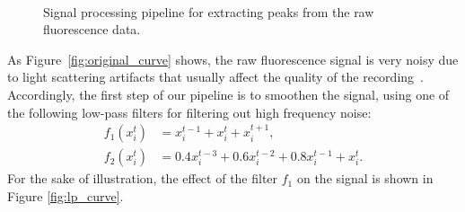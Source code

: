 \documentclass[wcp]{jmlr}
\begin{document}
\begin{figure}
\centering
{}
\\
\caption{Signal processing pipeline for extracting peaks from the raw fluorescence data.}
\label{fig:filtered-signal}
\end{figure}

As Figure~\ref{fig:original_curve} shows, the raw
fluorescence signal is very noisy due to light scattering artifacts that
usually affect the quality of the recording~\citep{lichtman2011big}.
Accordingly, the first step of our pipeline is to smoothen the signal, using
one of the following low-pass filters for filtering out high frequency noise:
\begin{align}
f_1(x^t_i) &= x^{t-1}_i + x^t_i + x^{t+1}_i, \label{eq:symetric-median} \\
f_2(x^t_i) &= 0.4 x^{t-3}_i + 0.6 x^{t-2}_i + 0.8 x^{t-1}_i + x_i^t.
\label{eq:weighted-asymetric-median}
\end{align}
For the sake of illustration, the effect of the filter $f_1$ on the signal
is shown in Figure \ref{fig:lp_curve}.
\end{document}
